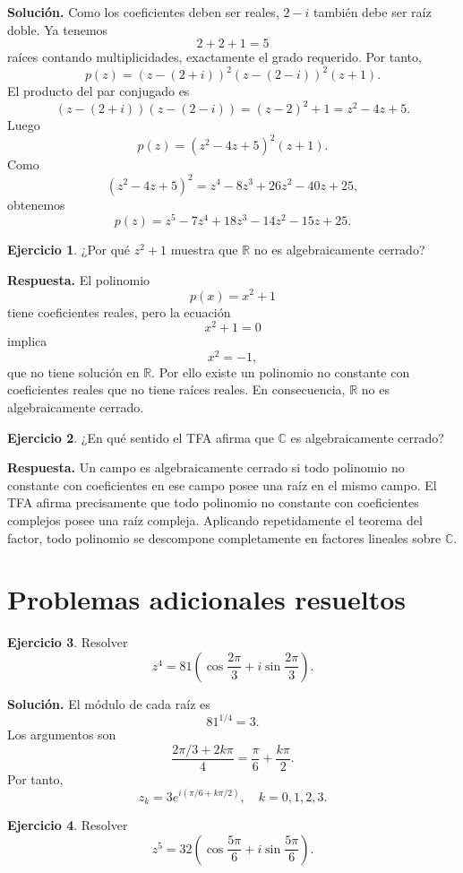 \documentclass[12pt]{article}
\theoremstyle{definition}
\newtheorem{ejercicio}{Ejercicio}[section]
\theoremstyle{remark}
\newcommand{\C}{\mathbb{C}}
\begin{document}
\textbf{Solución.}
Como los coeficientes deben ser reales, $2-i$ también debe ser raíz doble.
Ya tenemos
\[
2+2+1=5
\]
raíces contando multiplicidades, exactamente el grado requerido. Por tanto,
\[
p(z)=(z-(2+i))^2(z-(2-i))^2(z+1).
\]
El producto del par conjugado es
\[
(z-(2+i))(z-(2-i))
=(z-2)^2+1
=z^2-4z+5.
\]
Luego
\[
p(z)=(z^2-4z+5)^2(z+1).
\]
Como
\[
(z^2-4z+5)^2=z^4-8z^3+26z^2-40z+25,
\]
obtenemos
\[
\boxed{
p(z)=z^5-7z^4+18z^3-14z^2-15z+25.
}
\]

\begin{ejercicio}
¿Por qué $z^2+1$ muestra que $\mathbb{R}$ no es algebraicamente cerrado?
\end{ejercicio}

\textbf{Respuesta.}
El polinomio
\[
p(x)=x^2+1
\]
tiene coeficientes reales, pero la ecuación
\[
x^2+1=0
\]
implica
\[
x^2=-1,
\]
que no tiene solución en $\mathbb{R}$. Por ello existe un polinomio no
constante con coeficientes reales que no tiene raíces reales. En consecuencia,
$\mathbb{R}$ no es algebraicamente cerrado.

\begin{ejercicio}
¿En qué sentido el TFA afirma que $\C$ es algebraicamente cerrado?
\end{ejercicio}

\textbf{Respuesta.}
Un campo es algebraicamente cerrado si todo polinomio no constante con
coeficientes en ese campo posee una raíz en el mismo campo. El TFA afirma
precisamente que todo polinomio no constante con coeficientes complejos posee
una raíz compleja. Aplicando repetidamente el teorema del factor, todo
polinomio se descompone completamente en factores lineales sobre $\C$.

\section{Problemas adicionales resueltos}

\begin{ejercicio}
Resolver
\[
z^4=81\left(\cos\frac{2\pi}{3}+i\sin\frac{2\pi}{3}\right).
\]
\end{ejercicio}

\textbf{Solución.}
El módulo de cada raíz es
\[
81^{1/4}=3.
\]
Los argumentos son
\[
\frac{2\pi/3+2k\pi}{4}
=\frac{\pi}{6}+\frac{k\pi}{2}.
\]
Por tanto,
\[
\boxed{
z_k=3e^{i(\pi/6+k\pi/2)},\quad k=0,1,2,3.
}
\]

\begin{ejercicio}
Resolver
\[
z^5=32\left(\cos\frac{5\pi}{6}+i\sin\frac{5\pi}{6}\right).
\]
\end{ejercicio}
\end{document}
